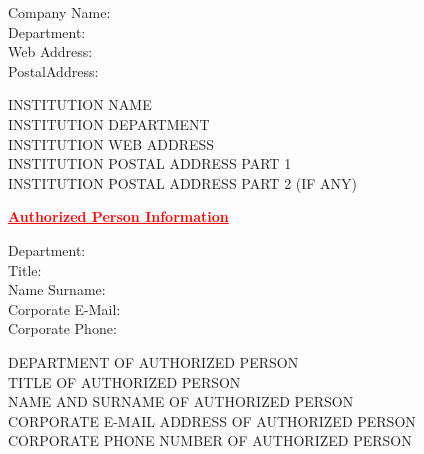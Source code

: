 \documentclass[12pt]{article}
\begin{document}
\begin{minipage}[t]{.20\textwidth}
  \begin{flushright}
      Company Name: \\
      Department: \\
      Web Address: \\
      PostalAddress:
  \end{flushright}
\end{minipage}%
\hspace{0.5cm}
\begin{minipage}[t]{.80\textwidth}
  INSTITUTION NAME \\
  INSTITUTION DEPARTMENT \\
  INSTITUTION WEB ADDRESS\\
  INSTITUTION POSTAL ADDRESS PART 1\\
  INSTITUTION POSTAL ADDRESS PART 2 (IF ANY)
\end{minipage}

\newpage
    {\centering
  \textcolor{red}{\bfseries \ul{Authorized Person Information}}
  \\[1\baselineskip]
  \par}

\begin{minipage}[t]{.25\textwidth}
  \begin{flushright}
      Department: \\
      Title: \\
      Name Surname: \\
      Corporate E-Mail: \\
      Corporate Phone:
  \end{flushright}
\end{minipage}%
\hspace{0.5cm}
\begin{minipage}[t]{.75\textwidth}
  DEPARTMENT OF AUTHORIZED PERSON \\
  TITLE OF AUTHORIZED PERSON \\
  NAME AND SURNAME OF AUTHORIZED PERSON \\
  CORPORATE E-MAIL ADDRESS OF AUTHORIZED PERSON \\
  CORPORATE PHONE NUMBER OF AUTHORIZED PERSON \\[2\baselineskip]
\end{minipage}
\end{document}
